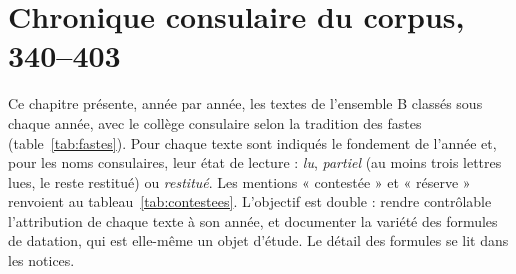 \chapter{Chronique consulaire du corpus, 340–403}\label{ch:chronique}

Ce chapitre présente, année par année, les textes de l’ensemble B classés sous chaque année, avec le collège consulaire selon la tradition des fastes (table~\ref{tab:fastes}). Pour chaque texte sont indiqués le fondement de l’année et, pour les noms consulaires, leur état de lecture : \emph{lu}, \emph{partiel} (au moins trois lettres lues, le reste restitué) ou \emph{restitué}. Les mentions « contestée » et « réserve » renvoient au tableau~\ref{tab:contestees}. L’objectif est double : rendre contrôlable l’attribution de chaque texte à son année, et documenter la variété des formules de datation, qui est elle-même un objet d’étude. Le détail des formules se lit dans les notices.


